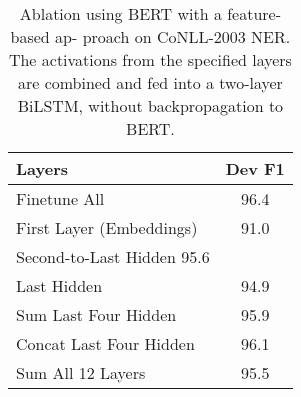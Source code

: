 	\begin{table}[hbp]
	\centering
	\begin{tabular}{@{}lc@{}}
	\toprule[0.11em]
	Layers & Dev F1 \\
	\midrule[0.07em]
	Finetune All & 96.4 \\
	\midrule[0.07em]
	First Layer (Embeddings) & 91.0 \\
	Second-to-Last Hidden 95.6 \\
	Last Hidden & 94.9 \\
	Sum Last Four Hidden & 95.9 \\
	Concat Last Four Hidden & 96.1 \\
	Sum All 12 Layers & 95.5 \\
	\bottomrule[0.11em]
	\end{tabular}
	\caption{Ablation using BERT with a feature-based ap- proach on CoNLL-2003 NER. The activations from the specified layers are combined and fed into a two-layer BiLSTM, without backpropagation to BERT.}
	\label{tab7}
	\end{table}

	\begin{table}
	\end{table}
	
	
	
	
	
	
	
	
	
	